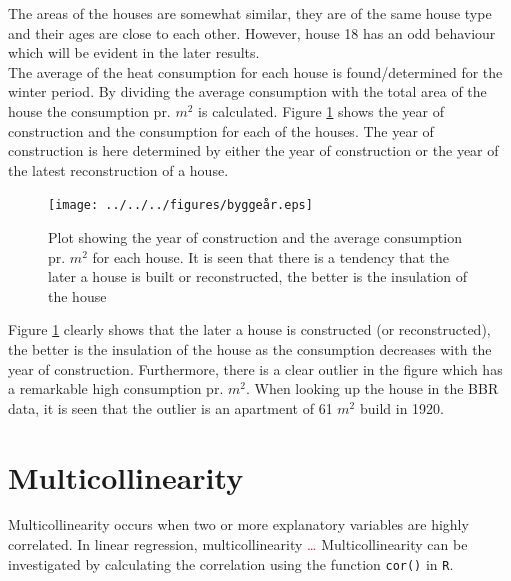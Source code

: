 \noindent The areas of the houses are somewhat similar, they are of the same house type and their ages are close to each other. However, house 18 has an odd behaviour which will be evident in the later results. \\

\noindent The average of the heat consumption for each house is found/determined for the winter period. By dividing the average consumption with the total area of the house the consumption pr. $m^2$ is calculated. Figure \ref{fig: byggeaar} shows the year of construction and the consumption for each of the houses. The year of construction is here determined by either the year of construction or the year of the latest reconstruction of a house. 
\begin{figure}
    \centering
    \texttt{[image: ../../../figures/byggeår.eps]}
    \caption{Plot showing the year of construction and the average consumption pr. $m^2$ for each house. It is seen that there is a tendency that the later a house is built or reconstructed, the better is the insulation of the house}
    \label{fig: byggeaar}
\end{figure}

\noindent Figure \ref{fig: byggeaar} clearly shows that the later a house is constructed (or reconstructed), the better is the insulation of the house as the consumption decreases with the year of construction. Furthermore, there is a clear outlier in the figure which has a remarkable high consumption pr. $m^2$. When looking up the house in the BBR data, it is seen that the outlier is an apartment of 61 $m^2$ build in 1920.  

\section{Multicollinearity}
Multicollinearity occurs when two or more explanatory variables are highly correlated. In linear regression, multicollinearity \textcolor{red}{\dots} Multicollinearity can be investigated by calculating the correlation using the function \texttt{cor()} in \texttt{R}.\\

